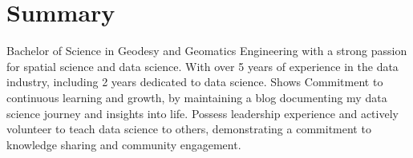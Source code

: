 \documentclass[a4paper, 11pt]{article}
\begin{document}

    \vspace{20pt}
    \section{Summary} %
    {Bachelor of Science in Geodesy and Geomatics Engineering with a strong passion for 
    spatial science and data science. With over 5 years of experience in the data industry, 
    including 2 years dedicated to data science. Shows Commitment to continuous learning and 
    growth, by maintaining a blog documenting my data science journey and insights into 
    life. Possess leadership experience and actively volunteer to teach data science to 
    others, demonstrating a commitment to knowledge sharing and community engagement.}
    \vspace{-10pt}
\end{document}

